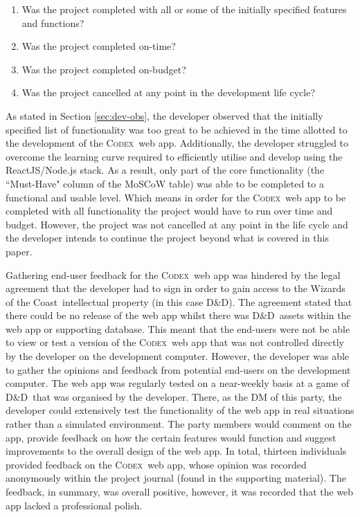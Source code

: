 \documentclass[final]{cmpreport}
\newcommand{\WotC}{Wizards of the Coast}
\newcommand{\dnd}{D\&D}
\newcommand{\Codex}{\textsc{Codex}}
\begin{document}
		\begin{enumerate}
			\item Was the project completed with all or some of the initially specified features and functions?
			\item Was the project completed on-time?
			\item Was the project completed on-budget?
			\item Was the project cancelled at any point in the development life cycle?
		\end{enumerate}
	
		As stated in Section \ref{sec:dev-obs}, the developer observed that the initially specified list of functionality was too great to be achieved in the time allotted to the development of the \Codex \ web app. Additionally, the developer struggled to overcome the learning curve required to efficiently utilise and develop using the ReactJS/Node.js stack. As a result, only part of the core functionality (the ``Must-Have" column of the MoSCoW table) was able to be completed to a functional and usable level. Which means in order for the \Codex \ web app to be completed with all functionality the project would have to run over time and budget. However, the project was not cancelled at any point in the life cycle and the developer intends to continue the project beyond what is covered in this paper. 
	
		Gathering end-user feedback for the \Codex \ web app was hindered by the legal agreement that the developer had to sign in order to gain access to the \WotC \ intellectual property (in this case \dnd). The agreement stated that there could be no release of the web app whilst there was \dnd \ assets within the web app or supporting database. This meant that the end-users were not be able to view or test a version of the \Codex \ web app that was not controlled directly by the developer on the development computer. However, the developer was able to gather the opinions and feedback from potential end-users on the development computer. The web app was regularly tested on a near-weekly basis at a game of \dnd \ that was organised by the developer. There, as the DM of this party, the developer could extensively test the functionality of the web app in real situations rather than a simulated environment. The party members would comment on the app, provide feedback on how the certain features would function and suggest improvements to the overall design of the web app. In total, thirteen individuals provided feedback on the \Codex \ web app, whose opinion was recorded anonymously within the project journal (found in the supporting material). The feedback, in summary, was overall positive, however, it was recorded that the web app lacked a professional polish.  
	
\end{document}
